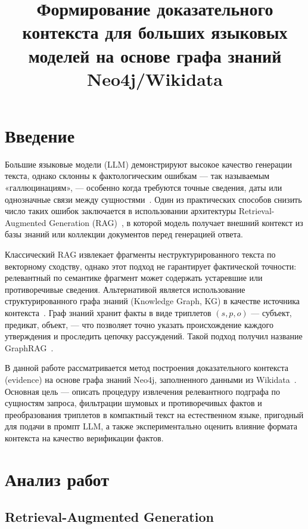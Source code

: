 \documentclass{misisarticle}
\title{Формирование доказательного контекста для больших языковых моделей
на основе графа знаний Neo4j/Wikidata}
\begin{document}
\maketitle

\section{Введение}

Большие языковые модели (LLM) демонстрируют высокое качество
генерации текста, однако склонны к фактологическим ошибкам —
так называемым «галлюцинациям», — особенно когда требуются
точные сведения, даты или однозначные связи между
сущностями~\cite{lewis2020rag}.
Один из практических способов снизить число таких ошибок
заключается в использовании архитектуры
Retrieval-Augmented Generation (RAG)~\cite{lewis2020rag},
в которой модель получает внешний контекст из базы знаний
или коллекции документов перед генерацией ответа.

Классический RAG извлекает фрагменты неструктурированного текста
по векторному сходству, однако этот подход не гарантирует
фактической точности: релевантный по семантике фрагмент
может содержать устаревшие или противоречивые сведения.
Альтернативой является использование структурированного
графа знаний (Knowledge Graph, KG) в качестве источника
контекста~\cite{hogan2021kg}.
Граф знаний хранит факты в виде триплетов
$(s, p, o)$ — субъект, предикат, объект, — что позволяет
точно указать происхождение каждого утверждения
и проследить цепочку рассуждений.
Такой подход получил название GraphRAG~\cite{edge2024graphrag}.

В данной работе рассматривается метод построения
доказательного контекста (evidence) на основе графа знаний
Neo4j, заполненного данными из Wikidata~\cite{vrandecic2014wikidata}.
Основная цель — описать процедуру извлечения релевантного
подграфа по сущностям запроса, фильтрации шумовых
и противоречивых фактов и преобразования триплетов
в компактный текст на естественном языке,
пригодный для подачи в промпт LLM,
а также экспериментально оценить влияние формата контекста
на качество верификации фактов.

\section{Анализ работ}

\subsection{Retrieval-Augmented Generation}
\end{document}
